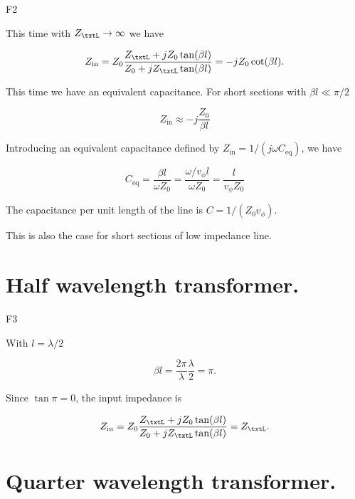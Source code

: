 F2

This time with \( Z_\txtL \rightarrow \infty \) we have

\begin{dmath}\label{eqn:uwavesDeck5SmithChartCore:120}
Z_{\textrm{in}} 
= Z_0 \frac{ Z_\txtL + j Z_0 \tan(\beta l) }{ Z_0 + j Z_\txtL \tan(\beta l)}
= -j Z_0 \cot(\beta l).
\end{dmath}

This time we have an equivalent capacitance.  For short sections with \( \beta l \ll \pi/2 \)

\begin{dmath}\label{eqn:uwavesDeck5SmithChartCore:140}
Z_{\textrm{in}}
\approx
-j \frac{Z_0}{\beta l}
\end{dmath}

Introducing an equivalent capacitance defined by \( Z_{\textrm{in}} = 1/(j \omega C_{\mathrm{eq}}) \), we have

\begin{dmath}\label{eqn:uwavesDeck5SmithChartCore:160}
C_{\mathrm{eq}}
=
\frac{ \beta l}{\omega Z_0}
=
\frac{ \omega/v_\phi l}{\omega Z_0}
=
\frac{ l}{v_\phi Z_0}
\end{dmath}

The capacitance per unit length of the line is \( C = 1/(Z_0 v_\phi) \).

This is also the case for short sections of low impedance line.

\section{Half wavelength transformer.}

F3

With \( l = \lambda/2 \)

\begin{dmath}\label{eqn:uwavesDeck5SmithChartCore:180}
\beta l 
= \frac{2 \pi}{\lambda} \frac{\lambda}{2}
= \pi.
\end{dmath}

Since \( \tan \pi = 0 \), the input impedance is

\begin{dmath}\label{eqn:uwavesDeck5SmithChartCore:200}
Z_{\textrm{in}} 
= Z_0 \frac{ Z_\txtL + j Z_0 \tan(\beta l) }{ Z_0 + j Z_\txtL \tan(\beta l)}
= Z_\txtL.
\end{dmath}

\section{Quarter wavelength transformer.}

